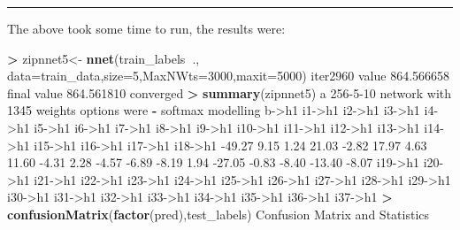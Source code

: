 \documentclass[]{article}
\newenvironment{Shaded}{\begin{snugshade}}{\end{snugshade}}
\newcommand{\DataTypeTok}[1]{\textcolor[rgb]{0.13,0.29,0.53}{#1}}
\newcommand{\DecValTok}[1]{\textcolor[rgb]{0.00,0.00,0.81}{#1}}
\newcommand{\FloatTok}[1]{\textcolor[rgb]{0.00,0.00,0.81}{#1}}
\newcommand{\KeywordTok}[1]{\textcolor[rgb]{0.13,0.29,0.53}{\textbf{#1}}}
\newcommand{\NormalTok}[1]{#1}
\newcommand{\OperatorTok}[1]{\textcolor[rgb]{0.81,0.36,0.00}{\textbf{#1}}}
\newcommand{\StringTok}[1]{\textcolor[rgb]{0.31,0.60,0.02}{#1}}
\begin{document}
\begin{center}\rule{0.5\linewidth}{0.5pt}\end{center}

The above took some time to run, the results were:

\begin{Shaded}
\begin{Highlighting}[]
\OperatorTok{>}\StringTok{ }\NormalTok{zipnnet5<-}\StringTok{ }\KeywordTok{nnet}\NormalTok{(train_labels}\OperatorTok{~}\NormalTok{., }\DataTypeTok{data=}\NormalTok{train_data,}\DataTypeTok{size=}\DecValTok{5}\NormalTok{,}\DataTypeTok{MaxNWts=}\DecValTok{3000}\NormalTok{,}\DataTypeTok{maxit=}\DecValTok{5000}\NormalTok{)}
\NormalTok{iter2960 value }\FloatTok{864.566658}
\NormalTok{final  value }\FloatTok{864.561810} 
\NormalTok{converged}
\OperatorTok{>}\StringTok{ }\KeywordTok{summary}\NormalTok{(zipnnet5)}
\NormalTok{a }\DecValTok{256-5-10}\NormalTok{ network with }\DecValTok{1345}\NormalTok{ weights}
\NormalTok{options were }\OperatorTok{-}\StringTok{ }\NormalTok{softmax modelling }
\NormalTok{   b->h1   i1->h1   i2->h1   i3->h1   i4->h1   i5->h1   i6->h1   i7->h1   i8->h1   i9->h1  i10->h1  i11->h1  i12->h1  i13->h1  i14->h1  i15->h1  i16->h1  i17->h1  i18->h1 }
  \FloatTok{-49.27}     \FloatTok{9.15}     \FloatTok{1.24}    \FloatTok{21.03}    \FloatTok{-2.82}    \FloatTok{17.97}     \FloatTok{4.63}    \FloatTok{11.60}    \FloatTok{-4.31}     \FloatTok{2.28}    \FloatTok{-4.57}    \FloatTok{-6.89}    \FloatTok{-8.19}     \FloatTok{1.94}   \FloatTok{-27.05}    \FloatTok{-0.83}    \FloatTok{-8.40}   \FloatTok{-13.40}    \FloatTok{-8.07} 
\NormalTok{ i19->h1  i20->h1  i21->h1  i22->h1  i23->h1  i24->h1  i25->h1  i26->h1  i27->h1  i28->h1  i29->h1  i30->h1  i31->h1  i32->h1  i33->h1  i34->h1  i35->h1  i36->h1  i37->h1 }
\OperatorTok{>}\StringTok{ }\KeywordTok{confusionMatrix}\NormalTok{(}\KeywordTok{factor}\NormalTok{(pred),test_labels)}
\NormalTok{Confusion Matrix and Statistics}


\end{Highlighting}
\end{Shaded}
\end{document}
